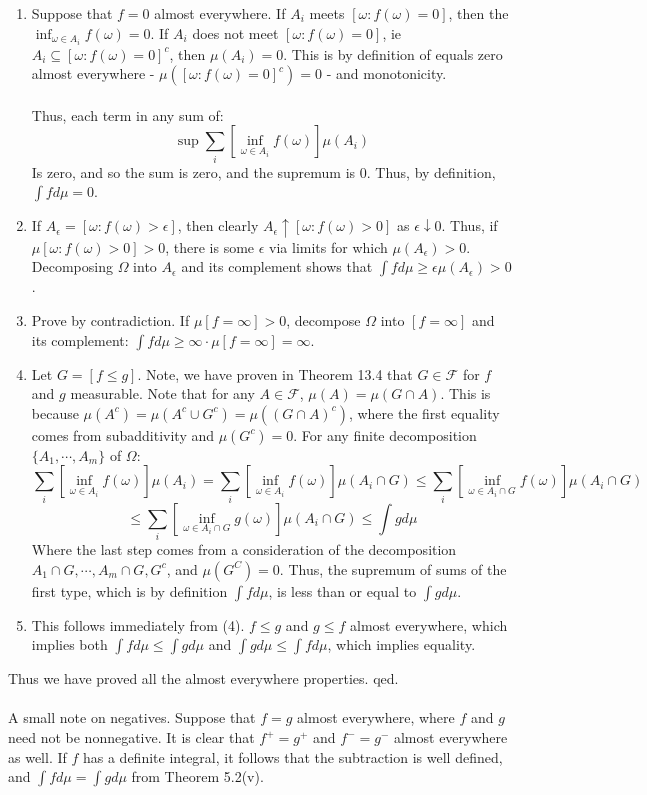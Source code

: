 \documentclass[12pt,a4paper]{article}
\newcommand{\1}[1]{\mathbbm{1}\left\{ #1 \right\}}
\newcommand{\fcal}{\mathcal{F}}
\begin{document}
\begin{enumerate}
	\item Suppose that $f = 0$ almost everywhere. If $A_i$ meets $[\omega: f(\omega) = 0]$, then the $\inf_{\omega \in A_i} f(\omega) = 0$. If $A_i$ does not meet $[\omega: f(\omega) = 0]$, ie $A_i \subseteq [\omega: f(\omega) = 0]^c$, then $\mu(A_i) = 0$. This is by definition of equals zero almost everywhere - $\mu\left([\omega: f(\omega) = 0]^c\right) = 0$ - and monotonicity.
	\\\\
	Thus, each term in any sum of:
	$$
		\sup \sum_i \left[\inf_{\omega \in A_i} f(\omega)\right] \mu(A_i)
	$$
	Is zero, and so the sum is zero, and the supremum is 0. Thus, by definition, $\int f d\mu = 0$.
	
	\item If $A_\epsilon = [\omega : f(\omega) > \epsilon]$, then clearly $A_\epsilon \uparrow [\omega : f(\omega) > 0]$ as $\epsilon \downarrow 0$. Thus, if $\mu[\omega : f(\omega) > 0] > 0$, there is some $\epsilon$ via limits for which $\mu(A_\epsilon) > 0$. Decomposing $\Omega$ into $A_\epsilon$ and its complement shows that $\int f d\mu \geq \epsilon \mu(A_\epsilon) > 0$.
	
	\item Prove by contradiction. If $\mu[f = \infty] > 0$, decompose $\Omega$ into $[f = \infty]$ and its complement: $\int f d\mu \geq \infty \cdot \mu[f = \infty] = \infty$.
	
	\item Let $G = [f \leq g]$. Note, we have proven in Theorem 13.4 that $G \in \fcal$ for $f$ and $g$ measurable. Note that for any $A \in \fcal$, $\mu(A) = \mu(G \cap A)$. This is because $\mu(A^c) = \mu(A^c \cup G^c) = \mu((G \cap A)^c)$, where the first equality comes from subadditivity and $\mu(G^c) = 0$. For any finite decomposition $\{A_1, \cdots, A_m\}$ of $\Omega$:
	$$
		\sum_i \left[\inf_{\omega \in A_i} f(\omega)\right] \mu(A_i) =
		\sum_i \left[\inf_{\omega \in A_i} f(\omega)\right] \mu(A_i \cap G) \leq
		\sum_i \left[\inf_{\omega \in A_i \cap G} f(\omega)\right] \mu(A_i \cap G)
	$$
	$$
		\leq
		\sum_i \left[\inf_{\omega \in A_i \cap G} g(\omega)\right] \mu(A_i \cap G) \leq
		\int g d\mu
	$$
	Where the last step comes from a consideration of the decomposition $A_1 \cap G, \cdots, A_m \cap G, G^c$, and $\mu(G^C) = 0$. Thus, the supremum of sums of the first type, which is by definition $\int f d\mu$, is less than or equal to $\int g d\mu$.
	
	\item This follows immediately from (4). $f \leq g$ and $g \leq f$ almost everywhere, which implies both $\int f d\mu \leq \int g d\mu$ and $\int g d\mu \leq \int f d\mu$, which implies equality.
\end{enumerate}
Thus we have proved all the almost everywhere properties. qed.
\\\\
A small note on negatives. Suppose that $f = g$ almost everywhere, where $f$ and $g$ need not be nonnegative. It is clear that $f^+ = g^+$ and $f^- = g^-$ almost everywhere as well. If $f$ has a definite integral, it follows that the subtraction is well defined, and $\int f d\mu = \int g d\mu$ from Theorem 5.2(v).
\end{document}
